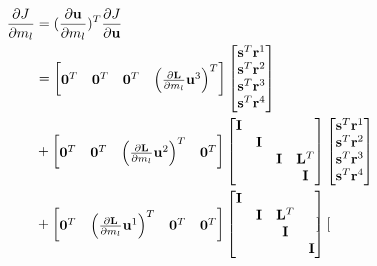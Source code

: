 \documentclass[revised,endfloat]{geophysics}
\begin{document}
\begin{equation}
\begin{split}
\frac{\partial J}{\partial m_l} &= (\frac{\partial {\bf u}}{\partial m_l})^T \frac{\partial J}{\partial {\bf u}} \\
&= \begin{bmatrix}
{\bf 0}^T & {\bf 0}^T & {\bf 0}^T & \left( {\frac{\partial {\bf L}}{\partial m_l} {\bf u}^3} \right)^T\\
\end{bmatrix}
\begin{bmatrix}
{\bf s}^T {\bf r}^1 \\
{\bf s}^T {\bf r}^2 \\
{\bf s}^T {\bf r}^3 \\
{\bf s}^T {\bf r}^4 \\
\end{bmatrix}            \\
&+ \begin{bmatrix}
{\bf 0}^T & {\bf 0}^T & \left( {\frac{\partial {\bf L}}{\partial m_l} {\bf u}^2}  \right)^T & {\bf 0}^T \\
\end{bmatrix}
\begin{bmatrix}
{\bf I} & & & \\
 & {\bf I} & & \\
 & &  {\bf I}& {\bf L}^T \\
 & & & {\bf I} \\
\end {bmatrix}
\begin{bmatrix}
{\bf s}^T {\bf r}^1 \\
{\bf s}^T {\bf r}^2 \\
{\bf s}^T {\bf r}^3 \\
{\bf s}^T {\bf r}^4 \\
\end{bmatrix}            \\
&+ \begin{bmatrix}
{\bf 0}^T & \left( {\frac{\partial {\bf L}}{\partial m_l} {\bf u}^1}  \right)^T & {\bf 0}^T & {\bf 0}^T \\
\end{bmatrix}
\begin{bmatrix}
{\bf I} & & & \\
 & {\bf I} & {\bf L}^T & \\
 & &  {\bf I}&  \\
 & & & {\bf I} \\
\end {bmatrix}
\begin{bmatrix}

\end{bmatrix}
\end{split}
\end{equation}
\end{document}
